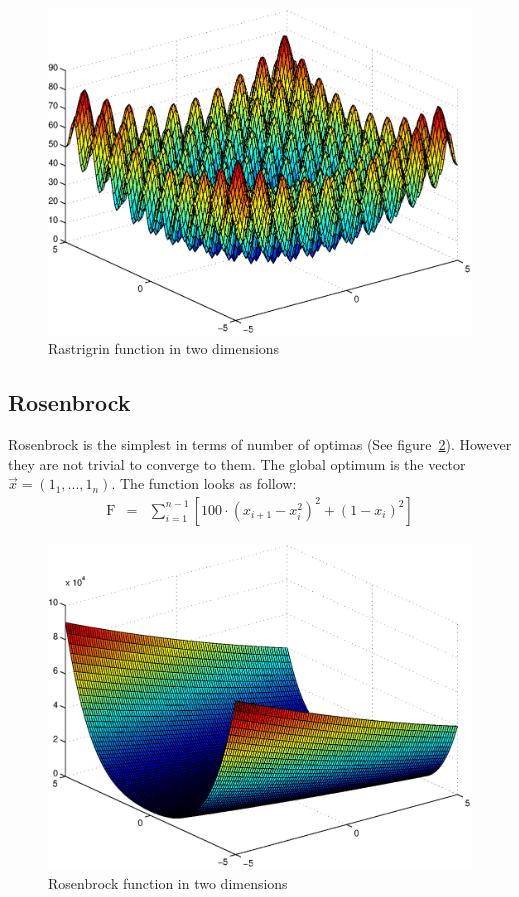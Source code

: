 \documentclass{acm_proc_article-sp}
\begin{document}
\begin{figure}[ht]
\centering
\includegraphics[scale=0.4]{fig-rastrigrin}
\caption{Rastrigrin function in two dimensions}\label{fig:rastrigrin}
\end{figure}

\subsection{Rosenbrock}
Rosenbrock is the simplest in terms of number of optimas (See figure~\ref{fig:rosenbrock}). However they are not trivial to converge to them. The global optimum is the vector $\vec{x} = (1_1, ..., 1_n)$. The function looks as follow:
\begin{eqnarray*}
\mathop{F(\vec{x})} &=& \sum\limits_{i=1}^{n-1}[100 \cdot (x_{i+1} - x_i^2)^2 + (1-x_i)^2]
\end{eqnarray*}

\begin{figure}[ht]
\centering
\includegraphics[scale=0.4]{fig-rosenbrock}
\caption{Rosenbrock function in two dimensions}\label{fig:rosenbrock}
\end{figure}
\end{document}
